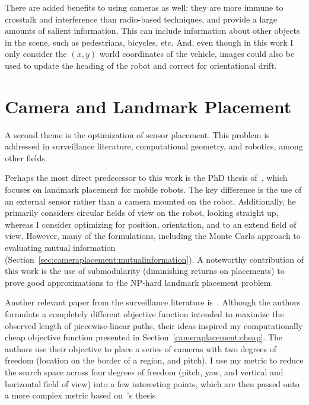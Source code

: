 \documentclass[a4paper,12pt,twoside,openright]{report}
\begin{document}
There are added benefits to using cameras as well: they are more immune
to crosstalk and interference than radio-based techniques, and provide
a large amounts of salient information. This can include 
information about other objects in the scene, such as pedestrians,
bicycles, etc. And, even though in this work I only consider
the $(x,y)$ world coordinates of the vehicle, images could also be used
to update the heading of the robot and correct for orientational drift.






\section{Camera and Landmark Placement}

A second theme is the optimization of sensor placement. This problem is addressed
in surveillance literature, computational geometry, and robotics, among other fields.

Perhaps the most direct predecessor to this work is the PhD thesis of~\citeauthor{beinhofer2014landmark}\cite{beinhofer2014landmark},
which focuses on landmark placement for mobile robots. The key difference
is the use of an external sensor rather than a camera mounted on the robot.
Additionally, he primarily considers circular fields of view on the robot, looking
straight up, whereas I consider optimizing for position, orientation,
and to an extend field of view. However, many of the formulations, including
the Monte Carlo approach to evaluating mutual information (Section~\ref{sec:cameraplacement:mutualinformation}).
A noteworthy contribution of this work is the use of submodularity (diminishing returns
on placements) to prove good approximations to the NP-hard landmark placement problem.

Another relevant paper from the surveillance literature is~\cite{bodor2007optimal}.
Although the authors formulate a completely different objective function intended
to maximize the observed length of piecewise-linear paths,
their ideas inspired my computationally cheap objective function presented 
in Section~\ref{cameraplacement:cheap}. The authors use their objective
to place a series of cameras with two degrees of freedom (location
on the border of a region, and pitch). I use my metric to reduce 
the search space across four degrees of freedom (pitch, yaw, and vertical and
horizontal field of view) into a few interesting points, 
which are then passed onto a more complex metric based on~\citeauthor{beinhofer2014landmark}'s thesis.
\end{document}
